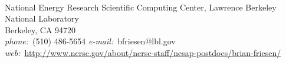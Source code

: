 \documentclass[11pt,letterpaper,english]{article}
\begin{document}
\setlength{\parindent}{0in} %

\pagestyle{fancy}   \renewcommand{%
\headrulewidth}{0.0pt}



\\
{National Energy Research Scientific Computing Center, Lawrence Berkeley National Laboratory\\Berkeley, CA 94720}\\ \smallskip
{{\it phone:}~(510) 486-5654 \hskip 2mm
{\it e-mail:}~bfriesen@lbl.gov \hskip 2mm \\[-0.25em]
{\it web:}~\url{http://www.nersc.gov/about/nersc-staff/nesap-postdocs/brian-friesen/}}
\end{document}
